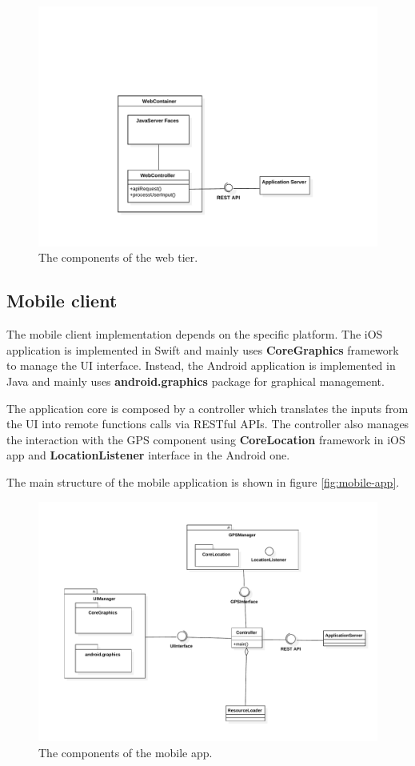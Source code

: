 \begin{figure}
    \centering
    \includegraphics[width=\textwidth]{diagrams/class_webcomponents}
    \caption{The components of the web tier.}
    \label{fig:web-components}
\end{figure}

\subsection{Mobile client}
The mobile client implementation depends on the specific platform. 
The iOS application is implemented in Swift and mainly uses \textbf{CoreGraphics} framework to manage the UI interface.
Instead, the Android application is implemented in Java and mainly uses \textbf{android.graphics} package for graphical management.

The application core is composed by a controller which translates the inputs from the UI into remote functions calls via  RESTful APIs. The controller also manages the interaction with the GPS component using  \textbf{CoreLocation} framework in iOS app and \textbf{LocationListener} interface in the Android one.

The main structure of the mobile application is shown in figure \autoref{fig:mobile-app}.

\begin{figure}
    \centering
    \includegraphics[width=\textwidth]{diagrams/class_mobileapp}
    \caption{The components of the mobile app.}
    \label{fig:mobile-app}
\end{figure}


\FloatBarrier
